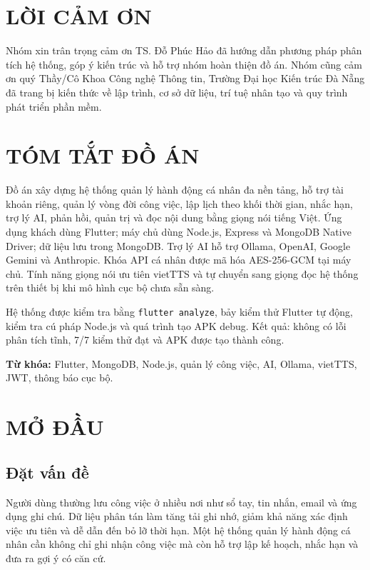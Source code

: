 \documentclass[12pt,a4paper,oneside]{report}
\newcommand{\advisor}{TS. Đỗ Phúc Hảo}
\begin{document}
\chapter*{LỜI CẢM ƠN}
Nhóm xin trân trọng cảm ơn \advisor{} đã hướng dẫn phương pháp phân tích hệ thống,
góp ý kiến trúc và hỗ trợ nhóm hoàn thiện đồ án. Nhóm cũng cảm ơn quý Thầy/Cô Khoa
Công nghệ Thông tin, Trường Đại học Kiến trúc Đà Nẵng đã trang bị kiến thức về lập
trình, cơ sở dữ liệu, trí tuệ nhân tạo và quy trình phát triển phần mềm.

\chapter*{TÓM TẮT ĐỒ ÁN}
Đồ án xây dựng hệ thống quản lý hành động cá nhân đa nền tảng, hỗ trợ tài khoản riêng,
quản lý vòng đời công việc, lập lịch theo khối thời gian, nhắc hạn, trợ lý AI, phản hồi,
quản trị và đọc nội dung bằng giọng nói tiếng Việt. Ứng dụng khách dùng Flutter; máy chủ
dùng Node.js, Express và MongoDB Native Driver; dữ liệu lưu trong MongoDB. Trợ lý AI
hỗ trợ Ollama, OpenAI, Google Gemini và Anthropic. Khóa API cá nhân được mã hóa
AES-256-GCM tại máy chủ. Tính năng giọng nói ưu tiên vietTTS và tự chuyển sang giọng
đọc hệ thống trên thiết bị khi mô hình cục bộ chưa sẵn sàng.

Hệ thống được kiểm tra bằng \texttt{flutter analyze}, bảy kiểm thử Flutter tự động,
kiểm tra cú pháp Node.js và quá trình tạo APK debug. Kết quả: không có lỗi phân tích
tĩnh, 7/7 kiểm thử đạt và APK được tạo thành công.

\textbf{Từ khóa:} Flutter, MongoDB, Node.js, quản lý công việc, AI, Ollama, vietTTS,
JWT, thông báo cục bộ.

\tableofcontents\listoffigures\listoftables
\clearpage{}

\chapter{MỞ ĐẦU}
\section{Đặt vấn đề}
Người dùng thường lưu công việc ở nhiều nơi như sổ tay, tin nhắn, email và ứng dụng
ghi chú. Dữ liệu phân tán làm tăng tải ghi nhớ, giảm khả năng xác định việc ưu tiên và
dễ dẫn đến bỏ lỡ thời hạn. Một hệ thống quản lý hành động cá nhân cần không chỉ ghi
nhận công việc mà còn hỗ trợ lập kế hoạch, nhắc hạn và đưa ra gợi ý có căn cứ.
\end{document}
